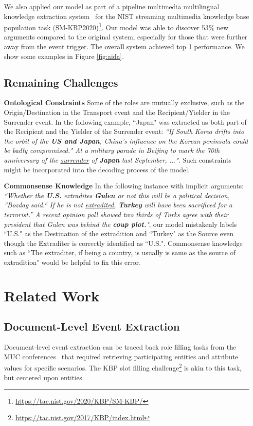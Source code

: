 We also applied our model as part of a pipeline multimedia multilingual knowledge extraction system~\cite{GAIASystem2020} for the NIST streaming multimedia knowledge base population task (SM-KBP2020)\footnote{\url{https://tac.nist.gov/2020/KBP/SM-KBP/}}. Our model was able to discover 53\% new arguments compared to the original system, especially for those that were further away from the event trigger. The overall system achieved top 1 performance. We show some examples in Figure \ref{fig:aida}. 

\subsection{Remaining Challenges}
\noindent \textbf{Ontological Constraints} 
Some of the roles are mutually exclusive, such as the Origin/Destination in the Transport event and the Recipient/Yielder in the Surrender event.
In the following example, ``Japan" was extracted as both part of the Recipient and the Yielder of the Surrender event: 
\textit{``If South Korea drifts into the orbit of the \textbf{US and Japan}, China's influence on the Korean peninsula could be badly compromised." At a military parade in Beijing to mark the 70th anniversary of the \underline{surrender} of \textbf{Japan} last September, ..."}. 
Such constraints might be incorporated into the decoding process of the model.

\noindent \textbf{Commonsense Knowledge}
In the following instance with implicit arguments: \textit{``Whether the \textbf{U.S. } extradites \textbf{Gulen}  or not this will be a political decision, ”Bozdag said.“ If he is not \underline{extradited}, \textbf{Turkey} will have been sacrificed for a terrorist.” A recent opinion poll showed two thirds of Turks agree with their president that Gulen was behind the \textbf{coup plot.}"}, our model mistakenly labels ``U.S." as the Destination of the extradition and ``Turkey" as the Source even though the Extraditer is correctly identified as ``U.S.". Commonsense knowledge such as ``The extraditer, if being a country, is usually is same as the source of extradition" would be helpful to fix this error. 

 
 
 
 \section{Related Work}

\subsection{Document-Level Event Extraction}
Document-level event extraction can be traced back role filling tasks from the MUC conferences~\cite{Grishman1996MUC6} that required retrieving participating entities and attribute values for specific scenarios. The KBP slot filling challenge\footnote{\url{https://tac.nist.gov/2017/KBP/index.html}} is akin to this task, but centered upon entities. 

